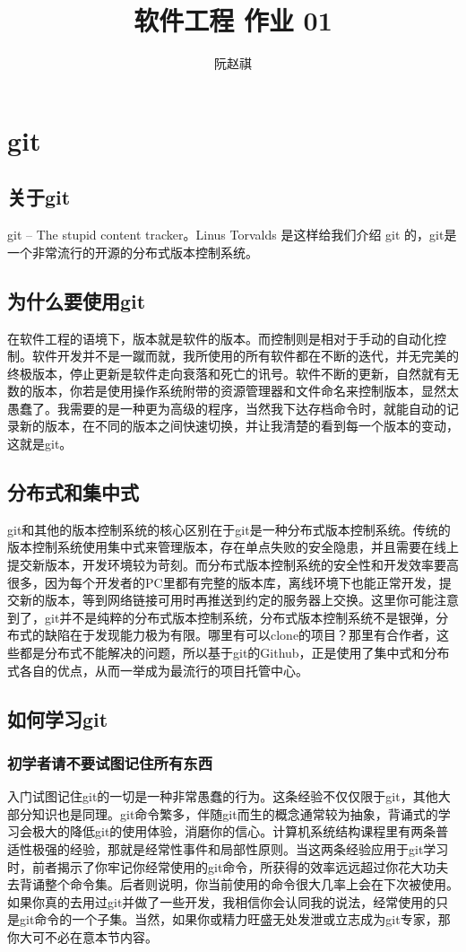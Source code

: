 \documentclass{article}
\title{软件工程 作业 01}
\author{阮赵祺}
\begin{document}
	
	\maketitle
	\section{git}
	\subsection{关于git}
	git --	The stupid content tracker。Linus Torvalds 是这样给我们介绍 git 的，git是一个非常流行的开源的分布式版本控制系统。
	\subsection{为什么要使用git}
	在软件工程的语境下，版本就是软件的版本。而控制则是相对于手动的自动化控制。软件开发并不是一蹴而就，我所使用的所有软件都在不断的迭代，并无完美的终极版本，停止更新是软件走向衰落和死亡的讯号。软件不断的更新，自然就有无数的版本，你若是使用操作系统附带的资源管理器和文件命名来控制版本，显然太愚蠢了。我需要的是一种更为高级的程序，当然我下达存档命令时，就能自动的记录新的版本，在不同的版本之间快速切换，并让我清楚的看到每一个版本的变动，这就是git。
	\subsection{分布式和集中式}
	git和其他的版本控制系统的核心区别在于git是一种分布式版本控制系统。传统的版本控制系统使用集中式来管理版本，存在单点失败的安全隐患，并且需要在线上提交新版本，开发环境较为苛刻。而分布式版本控制系统的安全性和开发效率要高很多，因为每个开发者的PC里都有完整的版本库，离线环境下也能正常开发，提交新的版本，等到网络链接可用时再推送到约定的服务器上交换。这里你可能注意到了，git并不是纯粹的分布式版本控制系统，分布式版本控制系统不是银弹，分布式的缺陷在于发现能力极为有限。哪里有可以clone的项目？那里有合作者，这些都是分布式不能解决的问题，所以基于git的Github，正是使用了集中式和分布式各自的优点，从而一举成为最流行的项目托管中心。
	\subsection{如何学习git}
	\subsubsection{初学者请不要试图记住所有东西}
	入门试图记住git的一切是一种非常愚蠢的行为。这条经验不仅仅限于git，其他大部分知识也是同理。git命令繁多，伴随git而生的概念通常较为抽象，背诵式的学习会极大的降低git的使用体验，消磨你的信心。计算机系统结构课程里有两条普适性极强的经验，那就是经常性事件和局部性原则。当这两条经验应用于git学习时，前者揭示了你牢记你经常使用的git命令，所获得的效率远远超过你花大功夫去背诵整个命令集。后者则说明，你当前使用的命令很大几率上会在下次被使用。如果你真的去用过git并做了一些开发，我相信你会认同我的说法，经常使用的只是git命令的一个子集。当然，如果你或精力旺盛无处发泄或立志成为git专家，那你大可不必在意本节内容。
\end{document}

